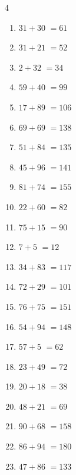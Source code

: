 \begin{multicols}{4}
\begin{enumerate}
  \item $31+30$
        $=61$

  \item $31+21$
        $=52$

  \item $2+32$
        $=34$

  \item $59+40$
        $=99$

  \item $17+89$
        $=106$

  \item $69+69$
        $=138$

  \item $51+84$
        $=135$

  \item $45+96$
        $=141$

\columnbreak %

\resetques

  \item $81+74$
        $=155$

  \item $22+60$
        $=82$

  \item $75+15$
        $=90$

  \item $7+5$
        $=12$

  \item $34+83$
        $=117$

  \item $72+29$
        $=101$

  \item $76+75$
        $=151$

  \item $54+94$
        $=148$

  \item $57+5$
        $=62$

  \item $23+49$
        $=72$

  \item $20+18$
        $=38$

  \item $48+21$
        $=69$

  \item $90+68$
        $=158$

  \item $86+94$
        $=180$

  \item $47+86$
        $=133$


\end{enumerate}
\end{multicols}
